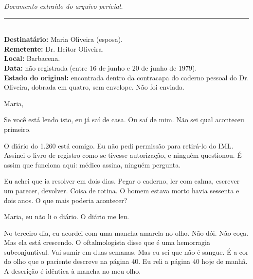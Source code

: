 
\noindent \textit{Documento extraído do arquivo pericial.}

\vspace{0.5em}\noindent\rule{\textwidth}{0.5pt}\vspace{0.5em}

\\[-0.2em]

\noindent \textbf{Destinatário:} Maria Oliveira (esposa).\\
\noindent \textbf{Remetente:} Dr. Heitor Oliveira.\\
\noindent \textbf{Local:} Barbacena.\\
\noindent\textbf{Data:} não registrada (entre 16 de junho e 20 de junho de 1979).\\
\noindent\textbf{Estado do original:} encontrada dentro da contracapa do caderno pessoal do Dr. Oliveira, dobrada em quatro, sem envelope. Não foi enviada.

\noindent Maria,

\noindent Se você está lendo isto, eu já saí de casa. Ou saí de mim. Não sei qual
\noindent aconteceu primeiro.

\noindent O diário do 1.260 está comigo. Eu não pedi permissão para retirá-lo
\noindent do IML. Assinei o livro de registro como se tivesse autorização, e ninguém
\noindent questionou. É assim que funciona aqui: médico assina, ninguém pergunta.

\noindent Eu achei que ia resolver em dois dias. Pegar o caderno, ler com calma,
\noindent escrever um parecer, devolver. Coisa de rotina. O homem estava morto havia
\noindent sessenta e dois anos. O que mais poderia acontecer?

\noindent Maria, eu não li o diário. O diário me leu.

\noindent No terceiro dia, eu acordei com uma mancha amarela no olho. Não dói.
\noindent Não coça. Mas ela está crescendo. O oftalmologista disse que é uma
\noindent hemorragia subconjuntival. Vai sumir em duas semanas. Mas eu sei que não é
\noindent sangue. É a cor do olho que o paciente descreve na página 40. Eu reli a
\noindent página 40 hoje de manhã. A descrição é idêntica à mancha no meu olho.


